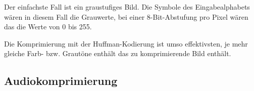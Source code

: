 \documentclass[twoside,11pt,a4paper]{article}
\theoremstyle{break}
\begin{document}
Der einfachste Fall ist ein graustufiges Bild. Die Symbole des
Eingabealphabets wären in diesem Fall die Grauwerte, bei einer
8-Bit-Abstufung pro Pixel wären das die Werte von 0 bis 255.

Die Komprimierung mit der Huffman-Kodierung ist umso effektivsten, je
mehr gleiche Farb- bzw. Grautöne enthält das zu komprimierende Bild
enthält.

\subsection{Audiokomprimierung}

\renewcommand{\refname}{Literaturverzeichnis}


\end{document}
